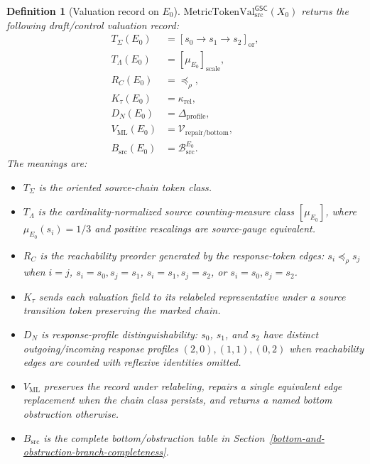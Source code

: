 \documentclass[11pt]{article}
\newcommand{\MetricTokenVal}{\mathrm{MetricTokenVal}_{\mathrm{src}}^{\mathsf{GSC}}}
\newcommand{\Ezero}{E_{0}}
\newtheorem{definition}{Definition}
\begin{document}
\begin{definition}[Valuation record on \(\Ezero\)]
\(\MetricTokenVal(X_0)\) returns the following draft/control valuation record:
\[
\begin{aligned}
T_{\Sigma}(\Ezero) &= [s_0\to s_1\to s_2]_{\mathrm{or}},\\
T_{\Lambda}(\Ezero) &= [\mu_{\Ezero}]_{\mathrm{scale}},\\
R_C(\Ezero) &= \preceq_{\rho},\\
K_{\tau}(\Ezero) &= \kappa_{\mathrm{rel}},\\
D_N(\Ezero) &= \Delta_{\mathrm{profile}},\\
V_{\mathrm{ML}}(\Ezero) &= \mathcal{V}_{\mathrm{repair}/\mathrm{bottom}},\\
B_{\mathrm{src}}(\Ezero) &= \mathcal{B}_{\mathrm{src}}^{\Ezero}.
\end{aligned}
\]
The meanings are:
\begin{itemize}[leftmargin=*]
  \item \(T_{\Sigma}\) is the oriented source-chain token class.
  \item \(T_{\Lambda}\) is the cardinality-normalized source counting-measure
  class \([\mu_{\Ezero}]\), where \(\mu_{\Ezero}(s_i)=1/3\) and positive
  rescalings are source-gauge equivalent.
  \item \(R_C\) is the reachability preorder generated by the response-token
  edges: \(s_i\preceq_{\rho}s_j\) when \(i=j\), \(s_i=s_0,s_j=s_1\), \(s_i=s_1,
  s_j=s_2\), or \(s_i=s_0,s_j=s_2\).
  \item \(K_{\tau}\) sends each valuation field to its relabeled
  representative under a source transition token preserving the marked chain.
  \item \(D_N\) is response-profile distinguishability: \(s_0\), \(s_1\), and
  \(s_2\) have distinct outgoing/incoming response profiles
  \((2,0),(1,1),(0,2)\) when reachability edges are counted with reflexive
  identities omitted.
  \item \(V_{\mathrm{ML}}\) preserves the record under relabeling, repairs a
  single equivalent edge replacement when the chain class persists, and
  returns a named bottom obstruction otherwise.
  \item \(B_{\mathrm{src}}\) is the complete bottom/obstruction table in
  Section~\ref{bottom-and-obstruction-branch-completeness}.
\end{itemize}
\end{definition}
\end{document}
